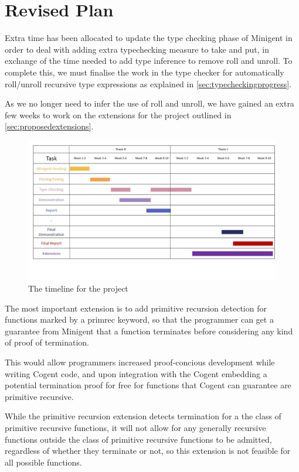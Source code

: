 \chapter{Revised Plan}
\label{ch:plan}

Extra time has been allocated to update the type checking phase of Minigent in order to deal with
adding extra typechecking measure to \textsf{take} and \textsf{put}, in exchange of the time
needed to add type inference to remove \textsf{roll} and \textsf{unroll}. To complete this,
we must finalise the work in the type checker for automatically \textsf{roll}/\textsf{unroll} recursive type expressions
as explained in \autoref{sec:typecheckingprogress}.

As we no longer need to infer the use of \textsf{roll} and \textsf{unroll}, we have gained an extra
few weeks to work on the extensions for the project outlined in \autoref{sec:proposedextensions}.

\begin{figure}
    \centering
    \includegraphics[height=0.50\textheight, angle=90]{content/revised_plan.jpg}
    \caption{The timeline for the project}
    \label{fig:revisedplan}
\end{figure}

The most important extension is to add primitive recursion detection for functions marked by
a \textsf{primrec} keyword, so that the programmer can get a guarantee from Minigent that
a function terminates before considering any kind of proof of termination.

This would allow programmers increased proof-concious development while writing Cogent code,
and upon integration with the Cogent embedding a potential termination proof for free for
functions that Cogent can guarantee are primitive recursive.

While the primitive recursion extension detects termination for a the class of primitive recursive functions,
it will not allow for any generally recursive functions outside the class of primitive recursive functions to
be admitted, regardless of whether they terminate or not, so this extension is not feasible for all possible functions.


